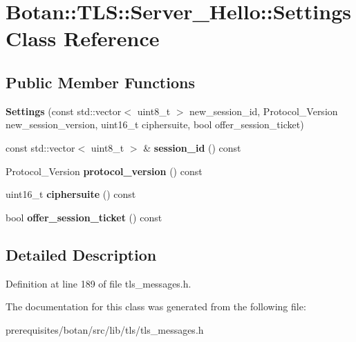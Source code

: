 \hypertarget{class_botan_1_1_t_l_s_1_1_server___hello_1_1_settings}{}\section{Botan\+:\+:T\+LS\+:\+:Server\+\_\+\+Hello\+:\+:Settings Class Reference}
\label{class_botan_1_1_t_l_s_1_1_server___hello_1_1_settings}
\subsection*{Public Member Functions}
\begin{DoxyCompactItemize}
\item 
\mbox{\label{class_botan_1_1_t_l_s_1_1_server___hello_1_1_settings_a88d27c8fb000b70b974191d3de069032}} 
{\bfseries Settings} (const std\+::vector$<$ uint8\+\_\+t $>$ new\+\_\+session\+\_\+id, Protocol\+\_\+\+Version new\+\_\+session\+\_\+version, uint16\+\_\+t ciphersuite, bool offer\+\_\+session\+\_\+ticket)
\item 
\mbox{\label{class_botan_1_1_t_l_s_1_1_server___hello_1_1_settings_a6e9383e62a3a7c666b7dd47eb353c0fa}} 
const std\+::vector$<$ uint8\+\_\+t $>$ \& {\bfseries session\+\_\+id} () const
\item 
\mbox{\label{class_botan_1_1_t_l_s_1_1_server___hello_1_1_settings_a8c7dc8261ad7272ad85a483d3b1cbd35}} 
Protocol\+\_\+\+Version {\bfseries protocol\+\_\+version} () const
\item 
\mbox{\label{class_botan_1_1_t_l_s_1_1_server___hello_1_1_settings_a7955a28969f6c4b278e9851afd63cc06}} 
uint16\+\_\+t {\bfseries ciphersuite} () const
\item 
\mbox{\label{class_botan_1_1_t_l_s_1_1_server___hello_1_1_settings_a8099d95773691d03549e122486206ec2}} 
bool {\bfseries offer\+\_\+session\+\_\+ticket} () const
\end{DoxyCompactItemize}


\subsection{Detailed Description}


Definition at line 189 of file tls\+\_\+messages.\+h.



The documentation for this class was generated from the following file\+:\begin{DoxyCompactItemize}
\item 
prerequisites/botan/src/lib/tls/tls\+\_\+messages.\+h\end{DoxyCompactItemize}
